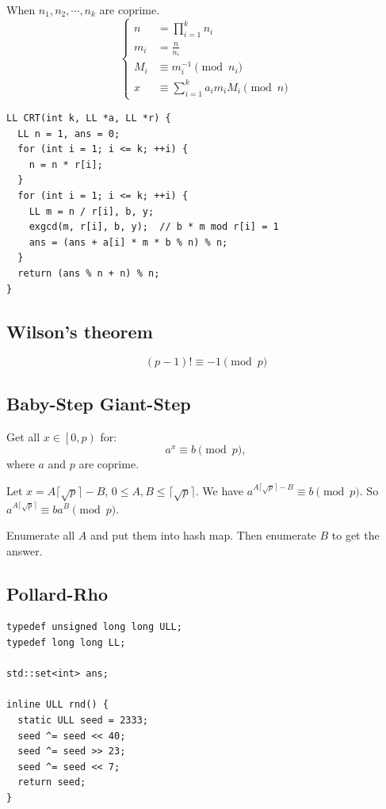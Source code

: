 \documentclass[9pt,landscape]{article}
\begin{document}
\begin{multicols}{2}
When $n_1,n_2,\cdots,n_k$ are coprime.
\begin{equation*}
\begin{cases}
n&=\prod_{i=1}^k n_i\\
m_i&=\frac{n}{n_i}\\
M_i&\equiv m_i^{-1}\pmod n_i\\
x&\equiv\sum_{i=1}^ka_im_iM_i\pmod n
\end{cases}
\end{equation*}

\begin{lstlisting}
LL CRT(int k, LL *a, LL *r) {
  LL n = 1, ans = 0;
  for (int i = 1; i <= k; ++i) {
    n = n * r[i];
  }
  for (int i = 1; i <= k; ++i) {
    LL m = n / r[i], b, y;
    exgcd(m, r[i], b, y);  // b * m mod r[i] = 1
    ans = (ans + a[i] * m * b % n) % n;
  }
  return (ans % n + n) % n;
}
\end{lstlisting}

\subsection{Wilson's theorem}
\begin{equation*}
(p-1)!\equiv -1\pmod p
\end{equation*}

\subsection{Baby-Step Giant-Step}
Get all $x\in\left[0,p\right)$ for:
\begin{equation*}
a^x\equiv b\pmod p,
\end{equation*}
where $a$ and $p$ are coprime.

Let $x=A\lceil\sqrt{p}\rceil-B$, $0\le A,B\le\lceil\sqrt{p}\rceil$. We have $a^{A\lceil\sqrt{p}\rceil-B}\equiv b\pmod p$. So $a^{A\lceil\sqrt{p}\rceil}\equiv ba^B\pmod p$.

Enumerate all $A$ and put them into hash map. Then enumerate $B$ to get the answer.

\subsection{Pollard-Rho}

\begin{lstlisting}
typedef unsigned long long ULL;
typedef long long LL;

std::set<int> ans;

inline ULL rnd() {
  static ULL seed = 2333;
  seed ^= seed << 40;
  seed ^= seed >> 23;
  seed ^= seed << 7;
  return seed;
}


\end{lstlisting}
\end{multicols}
\end{document}
